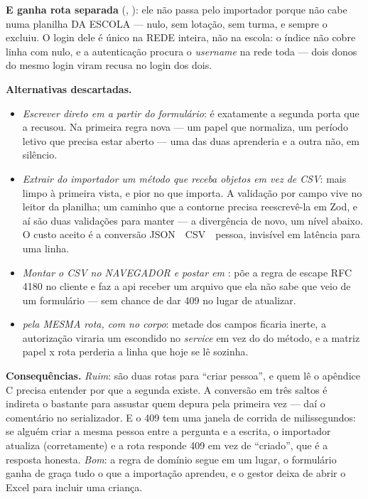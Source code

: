 \textbf{E  ganha rota separada}
(, ): ele não
passa pelo importador porque não cabe numa planilha DA ESCOLA --- 
nulo, sem lotação, sem turma, e  sempre o excluiu.
O login dele é único na REDE inteira, não na escola: o índice
 não cobre linha com  nulo, e a
autenticação procura o \emph{username} na rede toda --- dois donos do mesmo
login viram recusa no login dos dois.

\textbf{Alternativas descartadas.}
\begin{itemize}
  \item \emph{Escrever direto em  a partir do formulário}: é
    exatamente a segunda porta que a  recusou. Na primeira regra
    nova --- um papel que normaliza, um período letivo que precisa estar aberto
    --- uma das duas aprenderia e a outra não, em silêncio.
  \item \emph{Extrair do importador um método que receba objetos em vez de
    CSV}: mais limpo à primeira vista, e pior no que importa. A validação por
    campo vive no leitor da planilha; um caminho que a contorne precisa
    reescrevê-la em Zod, e aí são duas validações para manter --- a divergência
    de novo, um nível abaixo. O custo aceito é a conversão
    JSON~\seta{}~CSV~\seta{}~pessoa, invisível em latência para uma linha.
  \item \emph{Montar o CSV no NAVEGADOR e postar em }:
    põe a regra de escape RFC 4180 no cliente e faz a api receber um arquivo
    que ela não sabe que veio de um formulário --- sem chance de dar 409 no
    lugar de atualizar.
  \item \emph{ pela MESMA rota, com  no corpo}:
    metade dos campos ficaria inerte, a autorização viraria um  escondido
    no \emph{service} em vez do  do método, e a matriz papel x rota
    perderia a linha que hoje se lê sozinha.
\end{itemize}

\textbf{Consequências.} \emph{Ruim}: são duas rotas para \enquote{criar
pessoa}, e quem lê o apêndice C precisa entender por que a segunda existe. A
conversão em três saltos é indireta o bastante para assustar quem depura pela
primeira vez --- daí o comentário no serializador. E o 409 tem uma janela de
corrida de milissegundos: se alguém criar a mesma pessoa entre a pergunta e a
escrita, o importador atualiza (corretamente) e a rota responde 409
 em vez de \enquote{criado}, que é a resposta honesta.
\emph{Bom}: a regra de domínio segue em um lugar, o formulário ganha de graça
tudo o que a importação aprendeu, e o gestor deixa de abrir o Excel para
incluir uma criança.

